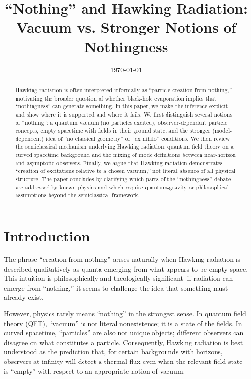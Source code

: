 \documentclass[11pt,a4paper]{article}
\title{“Nothing” and Hawking Radiation: Vacuum vs. Stronger Notions of Nothingness}
\author{ }
\date{\today}
\begin{document}
\maketitle

\begin{abstract}
Hawking radiation is often interpreted informally as ``particle creation from nothing,'' motivating the broader question of whether black-hole evaporation implies that ``nothingness'' can generate something. In this paper, we make the inference explicit and show where it is supported and where it fails. We first distinguish several notions of ``nothing'': a quantum vacuum (no particles excited), observer-dependent particle concepts, empty spacetime with fields in their ground state, and the stronger (model-dependent) idea of ``no classical geometry'' or ``ex nihilo'' conditions. We then review the semiclassical mechanism underlying Hawking radiation: quantum field theory on a curved spacetime background and the mixing of mode definitions between near-horizon and asymptotic observers. Finally, we argue that Hawking radiation demonstrates ``creation of excitations relative to a chosen vacuum,'' not literal absence of all physical structure. The paper concludes by clarifying which parts of the ``nothingness'' debate are addressed by known physics and which require quantum-gravity or philosophical assumptions beyond the semiclassical framework.
\end{abstract}

\section{Introduction}
The phrase ``creation from nothing'' arises naturally when Hawking radiation is described qualitatively as quanta emerging from what appears to be empty space. This intuition is philosophically and theologically significant: if radiation can emerge from ``nothing,'' it seems to challenge the idea that something must already exist.

However, physics rarely means ``nothing'' in the strongest sense. In quantum field theory (QFT), ``vacuum'' is not literal nonexistence; it is a state of the fields. In curved spacetime, ``particles'' are also not unique objects; different observers can disagree on what constitutes a particle. Consequently, Hawking radiation is best understood as the prediction that, for certain backgrounds with horizons, observers at infinity will detect a thermal flux even when the relevant field state is ``empty'' with respect to an appropriate notion of vacuum.
\end{document}
